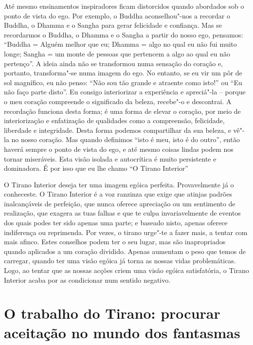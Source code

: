 \sectionBreak

Até mesmo ensinamentos inspiradores ficam distorcidos quando abordados
sob o ponto de vista do ego. Por exemplo, o Buddha aconselhou"-nos a
recordar o Buddha, o Dhamma e o Sangha para gerar felicidade e
confiança. Mas se recordarmos o Buddha, o Dhamma e o Sangha a partir do
nosso ego, pensamos: “Buddha = Alguém melhor que eu; Dhamma = algo no
qual eu não fui muito longe; Sangha = um monte de pessoas que pertencem
a algo ao qual eu não pertenço”. A ideia ainda não se transformou numa
sensação do coração e, portanto, transforma"-se numa imagem do ego. No
entanto, se eu vir um pôr de sol magnífico, eu não penso: “Não sou tão
grande e atraente como isto!” ou “Eu não faço parte disto”. Eu consigo
interiorizar a experiência e apreciá"-la -- porque o meu coração
compreende o significado da beleza, recebe"-o e descontrai. A recordação
funciona desta forma; é uma forma de elevar o coração, por meio de
interiorização e enfatização de qualidades como a compreensão,
felicidade, liberdade e integridade. Desta forma podemos compartilhar da
sua beleza, e vê"-la no nosso coração. Mas quando definimos ``isto é meu,
isto é do outro”, então haverá sempre o ponto de vista do ego, e até
mesmo coisas lindas podem nos tornar miseráveis. Esta visão isolada e
autocrítica é muito persistente e dominadora. É por isso que eu lhe
chamo “O Tirano Interior”

O Tirano Interior deseja ter uma imagem egóica perfeita. Provavelmente
já o conheceste. O Tirano Interior é a voz ranzinza que exige que
atinjas padrões inalcançáveis de perfeição, que nunca oferece apreciação
ou um sentimento de realização, que exagera as tuas falhas e que te
culpa invariavelmente de eventos dos quais podes ter sido apenas uma
parte; e baseado nisto, apenas oferece indiferença ou reprimenda. Por
vezes, o tirano urge"-te a fazer mais, a tentar com mais afinco. Estes
conselhos podem ter o seu lugar, mas são inapropriados quando aplicados
a um coração dividido. Apenas aumentam o peso que temos de carregar,
quando ter uma visão egóica já torna as nossas vidas problemáticas.
Logo, ao tentar que as nossas acções criem uma visão egóica
satisfatória, o Tirano Interior acaba por as condicionar num sentido
negativo.

\section{O trabalho do Tirano: procurar aceitação no mundo dos fantasmas}

